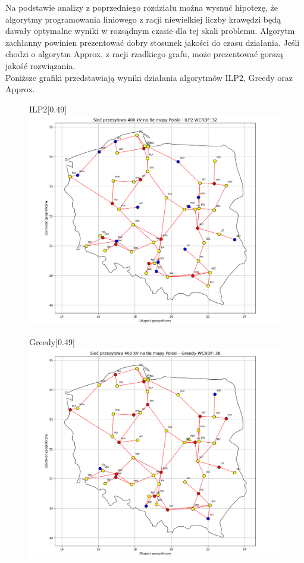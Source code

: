 Na podstawie analizy z poprzedniego rozdziału można wysnuć hipotezę, że algorytmy programowania liniowego z racji niewielkiej liczby krawędzi będą dawały optymalne wyniki w rozsądnym czasie dla tej skali problemu. Algorytm zachłanny powinien prezentować dobry stosunek jakości do czasu działania. Jeśli chodzi o algorytm Approx, z racji rzadkiego grafu, może prezentować gorszą jakość rozwiązania.\\

Poniższe grafiki przedstawiają wyniki działania algorytmów ILP2, Greedy oraz Approx.

\begin{figure}[htbp]
    \centering
    \begin{subcaptionbox}{ILP2\label{fig:img}}[0.49\linewidth]
        {\includegraphics[width=\linewidth]{assets/Poland/img.png}}
    \end{subcaptionbox}
    \hfill
    \begin{subcaptionbox}{Greedy\label{fig:img2}}[0.49\linewidth]
        {\includegraphics[width=\linewidth]{assets/Poland/img_2.png}}

\end{subcaptionbox}
\end{figure}
